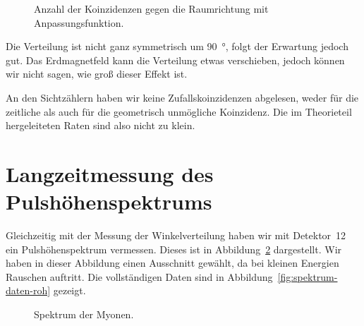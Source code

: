 \documentclass[11pt, ngerman, fleqn, DIV=15, headinclude, BCOR=2cm]{scrreprt}
\begin{document}
\begin{figure}[htbp]
    \centering
    \caption{%
        Anzahl der Koinzidenzen gegen die Raumrichtung mit Anpassungsfunktion.
    }
    \label{fig:winkel-fit}
\end{figure}

Die Verteilung ist nicht ganz symmetrisch um \SI{90}{\degree}, folgt der
Erwartung jedoch gut. Das Erdmagnetfeld kann die Verteilung etwas verschieben,
jedoch können wir nicht sagen, wie groß dieser Effekt ist.

An den Sichtzählern haben wir keine Zufallskoinzidenzen abgelesen, weder für
die zeitliche als auch für die geometrisch unmögliche Koinzidenz. Die im
Theorieteil hergeleiteten Raten sind also nicht zu klein.

\section{Langzeitmessung des Pulshöhenspektrums}
\label{sec:langzeit_puls}

Gleichzeitig mit der Messung der Winkelverteilung haben wir mit Detektor~12 ein
Pulshöhenspektrum vermessen. Dieses ist in Abbildung~\ref{fig:spektrum-daten}
dargestellt. Wir haben in dieser Abbildung einen Ausschnitt gewählt, da bei
kleinen Energien Rauschen auftritt. Die vollständigen Daten sind in
Abbildung~\ref{fig:spektrum-daten-roh} gezeigt.

\begin{figure}[htbp]
    \centering
    \caption{%
        Spektrum der Myonen.
    }
    \label{fig:spektrum-daten}
\end{figure}
\end{document}
